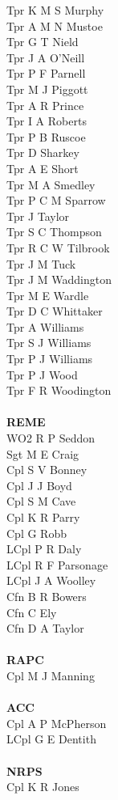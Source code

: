 \begin{multicols}{2}
  Tpr K M S Murphy \\
  Tpr A M N Mustoe \\
  Tpr G T Nield \\
  Tpr J A O'Neill \\
  Tpr P F Parnell \\
  Tpr M J Piggott \\
  Tpr A R Prince \\
  Tpr I A Roberts \\
  Tpr P B Ruscoe \\
  Tpr D Sharkey \\
  Tpr A E Short \\
  Tpr M A Smedley \\
  Tpr P C M Sparrow \\
  Tpr J Taylor \\
  Tpr S C Thompson \\
  Tpr R C W Tilbrook \\
  Tpr J M Tuck \\
  Tpr J M Waddington \\
  Tpr M E Wardle \\
  Tpr D C Whittaker \\
  Tpr A Williams \\
  Tpr S J Williams \\
  Tpr P J Williams \\
  Tpr P J Wood \\
  Tpr F R Woodington \\
  \\
  \textbf{REME} \\
  WO2 R P Seddon \\
  Sgt M E Craig \\
  Cpl S V Bonney \\
  Cpl J J Boyd \\
  Cpl S M Cave \\
  Cpl K R Parry \\
  Cpl G Robb \\
  LCpl P R Daly \\
  LCpl R F Parsonage \\
  LCpl J A Woolley \\
  Cfn B R Bowers \\
  Cfn C Ely \\
  Cfn D A Taylor \\
  \\
  \textbf{RAPC} \\
  Cpl M J Manning \\
  \\
  \textbf{ACC} \\
  Cpl A P McPherson \\
  LCpl G E Dentith \\
  \\
  \textbf{NRPS} \\
  Cpl K R Jones \\
\end{multicols}

